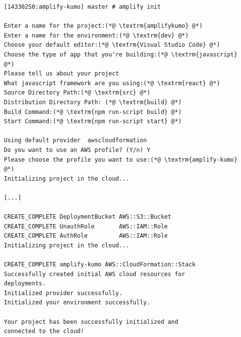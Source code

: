 \begin{lstlisting}[basicstyle=\ttfamily\small, breaklines=true , frame = single, backgroundcolor=\color{flashwhite} ]
[143302S0:amplify-kumo] master # amplify init

Enter a name for the project:(*@ \textrm{amplifykumo} @*)
Enter a name for the environment:(*@ \textrm{dev} @*)
Choose your default editor:(*@ \textrm{Visual Studio Code} @*)
Choose the type of app that you're building:(*@ \textrm{javascript} @*)
Please tell us about your project
What javascript framework are you using:(*@ \textrm{react} @*)
Source Directory Path:(*@ \textrm{src} @*)
Distribution Directory Path: (*@ \textrm{build} @*)
Build Command:(*@ \textrm{npm run-script build} @*)
Start Command:(*@ \textrm{npm run-script start} @*)

Using default provider  awscloudformation
Do you want to use an AWS profile? (Y/n) Y
Please choose the profile you want to use:(*@ \textrm{amplify-kumo} @*)
Initializing project in the cloud...

[...]

CREATE_COMPLETE DeploymentBucket AWS::S3::Bucket
CREATE_COMPLETE UnauthRole       AWS::IAM::Role
CREATE_COMPLETE AuthRole         AWS::IAM::Role
Initializing project in the cloud...

CREATE_COMPLETE amplify-kumo AWS::CloudFormation::Stack
Successfully created initial AWS cloud resources for
deployments.
Initialized provider successfully.
Initialized your environment successfully.

Your project has been successfully initialized and
connected to the cloud!

\end{lstlisting}


